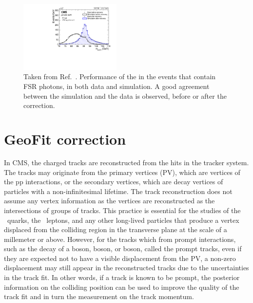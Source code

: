 \begin{figure}[!htb]
      \centering
      \captionsetup{justification=justified}
      \includegraphics[width=0.45\textwidth]{pics/muon_corr/FSR/FSRrecovery_Validation.pdf}
      \caption{Taken from Ref.~\cite{}.
               Performance of the \FSR in the \zmm events that contain FSR photons, in both data and simulation. 
               A good agreement between the simulation and the data is observed, before or after the correction.}
      \label{fig:fsr_val}
\end{figure}


\section{GeoFit correction} \label{sec:GeoFit}

In CMS, the charged tracks are reconstructed from the hits in the tracker system.
The tracks may originate from the primary vertices (PV), which are vertices of the pp interactions,
or the secondary vertices, which are decay vertices of particles with a non-infinitesimal lifetime.
The track reconstruction does not assume any vertex information as the vertices are reconstructed as the intersections of groups of tracks.
This practice is essential for the studies of the \Pqb ~quarks, the \tau ~leptons, 
and any other long-lived particles that produce a vertex displaced from the colliding region in the transverse plane at the scale of a millemeter or above.
However, for the tracks which from prompt interactions, such as the decay of a \PZ boson, \PW boson, or \PH boson,
called the prompt tracks, even if they are expected not to have a visible displacement from the PV, 
a non-zero displacement may still appear in the reconstructed tracks due to the uncertainties in the track fit.
In other words, if a track is known to be prompt, the posterior information on the colliding position 
can be used to improve the quality of the track fit and in turn the measurement on the track momentum.

